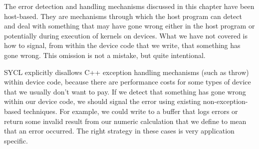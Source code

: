The error detection and handling mechanisms discussed in this chapter have been host-based. They are mechanisms through which the host program can detect and deal with something that may have gone wrong either in the host program or potentially during execution of kernels on devices. What we have not covered is how to signal, from within the device code that we write, that something has gone wrong. This omission is not a mistake, but quite intentional.\par

SYCL explicitly disallows C++ exception handling mechanisms (such as throw) within device code, because there are performance costs for some types of device that we usually don’t want to pay. If we detect that something has gone wrong within our device code, we should signal the error using existing non-exception-based techniques. For example, we could write to a buffer that logs errors or return some invalid result from our numeric calculation that we define to mean that an error occurred. The right strategy in these cases is very application specific.\par